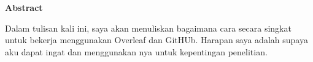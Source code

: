 \small
\noindent\textbf{Abstract}

Dalam tulisan kali ini, saya akan menuliskan bagaimana cara secara singkat untuk bekerja menggunakan Overleaf dan GitHUb. Harapan saya adalah supaya aku dapat ingat dan menggunakan nya untuk kepentingan penelitian.